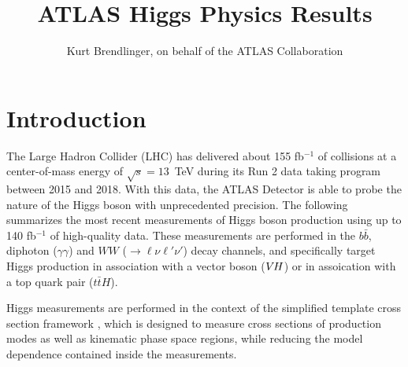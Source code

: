 \documentclass{moriond}
\def\vh{\texorpdfstring{\ensuremath{V\kern -0.1em H}\xspace}{VH\xspace}}
\begin{document}
\linenumbers

\vspace*{4cm}
\title{ATLAS Higgs Physics Results}

\author{ Kurt Brendlinger, on behalf of the ATLAS Collaboration }

\address{~\\DESY, Notkestra\ss e 85,\\ 22607 Hamburg, Germany}

\maketitle{}

\section{Introduction}

The Large Hadron Collider (LHC) \cite{Evans:2008zzb} has delivered about 155 fb$^{-1}$ of
collisions at a center-of-mass energy of $\sqrt{s}=13$~TeV during its Run 2 data taking program
between 2015 and 2018.
With this data, the
ATLAS Detector \cite{PERF-2007-01} is able to probe the nature of the Higgs boson with unprecedented
precision. The following summarizes the most recent measurements of Higgs boson production using up
to 140 fb$^{-1}$ of high-quality data. These measurements are performed in the $b\bar b$,
diphoton ($\gamma\gamma$) and $WW$ (${\rightarrow}\ell\nu\ell'\nu'$) decay channels, and specifically
target Higgs production in association with a vector boson (\vh) or in assoication with a top
quark pair ($t\bar tH$).

Higgs measurements are performed in the context of the simplified template cross section
framework \cite{deFlorian:2016spz,Badger:2016bpw},
which is designed to measure cross sections of production modes as well as kinematic phase space
regions, while reducing the model dependence contained inside the measurements.
\end{document}
